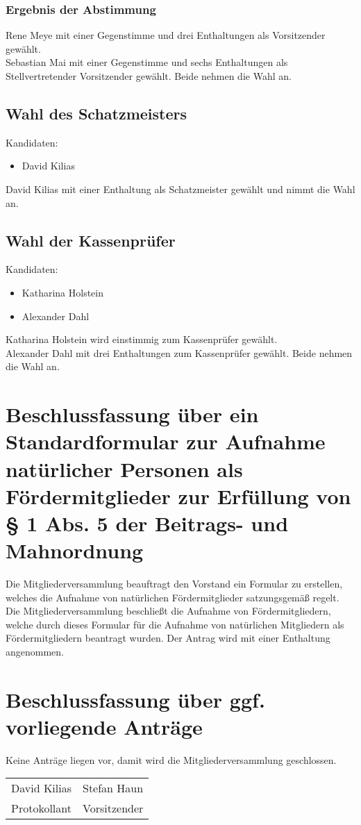 \documentclass[a4paper,12pt,titlepage]{scrartcl}
\begin{document}
\subsubsection*{Ergebnis der Abstimmung}
Rene Meye mit einer Gegenstimme und drei Enthaltungen als Vorsitzender gewählt. \\
Sebastian Mai mit einer Gegenstimme und sechs Enthaltungen als Stellvertretender Vorsitzender gewählt.
Beide nehmen die Wahl an.

\subsection{Wahl des Schatzmeisters}
Kandidaten:
\begin{itemize}
	\item David Kilias
\end{itemize}
David Kilias mit einer Enthaltung als Schatzmeister gewählt und nimmt die Wahl an.

\subsection{Wahl der Kassenprüfer}
Kandidaten:
\begin{itemize}
  \item Katharina Holstein
  \item Alexander Dahl
\end{itemize}
Katharina Holstein wird einstimmig zum Kassenprüfer gewählt. \\
Alexander Dahl mit drei Enthaltungen zum Kassenprüfer gewählt. Beide nehmen die Wahl an.

\section{Beschlussfassung über ein Standardformular zur Aufnahme natürlicher Personen als Fördermitglieder zur Erfüllung von § 1
Abs. 5 der Beitrags- und Mahnordnung}
Die Mitgliederversammlung beauftragt den Vorstand ein Formular zu erstellen,	welches die Aufnahme von natürlichen Fördermitglieder satzungsgemäß regelt.
Die Mitgliederversammlung beschließt die Aufnahme von Fördermitgliedern,	welche durch dieses Formular für die Aufnahme von natürlichen Mitgliedern als Fördermitgliedern beantragt wurden.
Der Antrag wird mit einer Enthaltung angenommen.

\section{Beschlussfassung über ggf. vorliegende Anträge}
Keine Anträge liegen vor, damit wird die Mitgliederversammlung geschlossen.

\nopagebreak
\vspace{10\baselineskip}
\begin{tabularx}{\textwidth}[b]{X X}
	\hline
	David Kilias & Stefan Haun \\
	Protokollant & Vorsitzender
\end{tabularx}

\appendix

\end{document}
